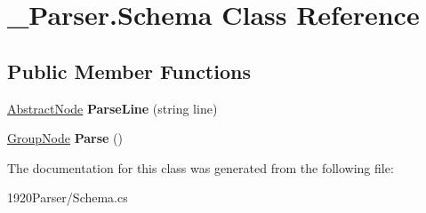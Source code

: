 \hypertarget{class__1920_parser_1_1_schema}{}\section{\+\_\+Parser.\+Schema Class Reference}
\label{class__1920_parser_1_1_schema}
\subsection*{Public Member Functions}
\begin{DoxyCompactItemize}
\item 
\hyperlink{class__1920_parser_1_1_abstract_node}{Abstract\+Node} {\bfseries Parse\+Line} (string line)\hypertarget{class__1920_parser_1_1_schema_a7593a133f248c1ad6599fc6e706b3fb8}{}\label{class__1920_parser_1_1_schema_a7593a133f248c1ad6599fc6e706b3fb8}

\item 
\hyperlink{class__1920_parser_1_1_group_node}{Group\+Node} {\bfseries Parse} ()\hypertarget{class__1920_parser_1_1_schema_a970c7c326e6f505c5798392da0fa0385}{}\label{class__1920_parser_1_1_schema_a970c7c326e6f505c5798392da0fa0385}

\end{DoxyCompactItemize}


The documentation for this class was generated from the following file\+:\begin{DoxyCompactItemize}
\item 
1920\+Parser/Schema.\+cs\end{DoxyCompactItemize}
